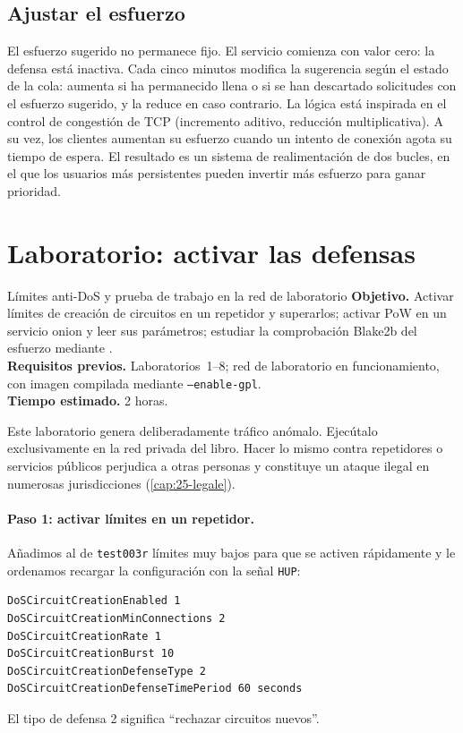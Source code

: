 \subsection{Ajustar el esfuerzo}

El esfuerzo sugerido no permanece fijo. El servicio comienza con valor cero: la defensa está inactiva. Cada cinco minutos modifica la sugerencia según el estado de la cola: aumenta si ha permanecido llena o si se han descartado solicitudes con el esfuerzo sugerido, y la reduce en caso contrario. La lógica está inspirada en el control de congestión de TCP (incremento aditivo, reducción multiplicativa). A su vez, los clientes aumentan su esfuerzo cuando un intento de conexión agota su tiempo de espera. El resultado es un sistema de realimentación de dos bucles, en el que los usuarios más persistentes pueden invertir más esfuerzo para ganar prioridad.

\section{Laboratorio: activar las defensas}\label{sec:lab-dos}

\begin{laboratorio}[9]{Límites anti-DoS y prueba de trabajo en la red de laboratorio}
\textbf{Objetivo.} Activar límites de creación de circuitos en un repetidor y superarlos; activar PoW en un servicio onion y leer sus parámetros; estudiar la comprobación Blake2b del esfuerzo mediante .\\
\textbf{Requisitos previos.} Laboratorios~1--8; red de laboratorio en funcionamiento, con imagen compilada mediante \texttt{--enable-gpl}.\\
\textbf{Tiempo estimado.} 2 horas.
\end{laboratorio}

\begin{attenzione}
Este laboratorio genera deliberadamente tráfico anómalo. Ejecútalo exclusivamente en la red privada del libro. Hacer lo mismo contra repetidores o servicios públicos perjudica a otras personas y constituye un ataque ilegal en numerosas jurisdicciones (\cref{cap:25-legale}).
\end{attenzione}

\paragraph{Paso 1: activar límites en un repetidor.} Añadimos al  de \texttt{test003r} límites muy bajos para que se activen rápidamente y le ordenamos recargar la configuración con la señal \texttt{HUP}:
\begin{lstlisting}[language=torrc,numbers=none]
DoSCircuitCreationEnabled 1
DoSCircuitCreationMinConnections 2
DoSCircuitCreationRate 1
DoSCircuitCreationBurst 10
DoSCircuitCreationDefenseType 2
DoSCircuitCreationDefenseTimePeriod 60 seconds
\end{lstlisting}
El tipo de defensa 2 significa \enquote{rechazar circuitos nuevos}.

